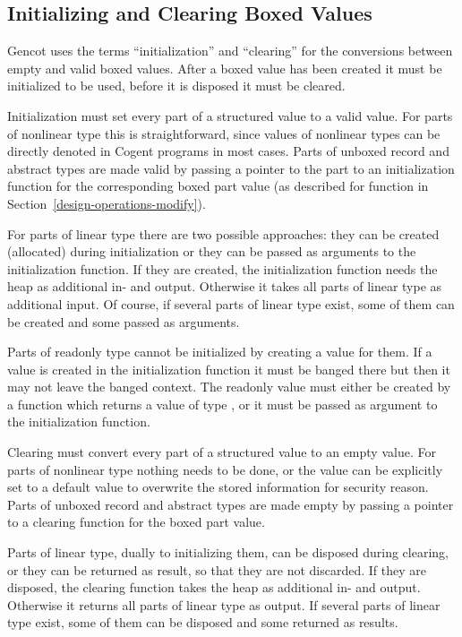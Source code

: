 \subsection{Initializing and Clearing Boxed Values}
\label{design-operations-init}

Gencot uses the terms ``initialization'' and ``clearing'' for the conversions between empty and valid boxed values.
After a boxed value has been created it must be initialized to be used, before it is disposed it must be cleared.

Initialization must set every part of a structured value to a valid value. For parts of nonlinear type this is
straightforward, since values of nonlinear types can be directly denoted in Cogent programs in most cases. Parts
of unboxed record and abstract types are made valid by passing a pointer to the part to an initialization
function for the corresponding boxed part value (as described for function  in 
Section~\ref{design-operations-modify}).

For parts of linear type there are two possible approaches: they can be created (allocated) during initialization 
or they can be passed as arguments to the initialization function. If they are created, the initialization function needs the heap as additional 
in- and output. Otherwise it takes all parts of linear type as additional input. Of course, if several parts
of linear type exist, some of them can be created and some passed as arguments.

Parts of readonly type  cannot be initialized by creating a value for them. If a value is created in the 
initialization function it must be banged there but then it may not leave the banged context. The readonly value 
must either be created by a function which returns a value of type , or it must be passed as argument
to the initialization function. 

Clearing must convert every part of a structured value to an empty value. For parts of nonlinear type nothing
needs to be done, or the value can be explicitly set to a default value to overwrite the stored information for
security reason. Parts of unboxed record and abstract types are made empty by passing a pointer to a clearing 
function for the boxed part value.

Parts of linear type, dually to initializing them, can be disposed during clearing, or they can be returned
as result, so that they are not discarded. If they are disposed, the clearing function takes the heap as 
additional in- and output. Otherwise it returns all parts of linear type as output. If several parts
of linear type exist, some of them can be disposed and some returned as results.

